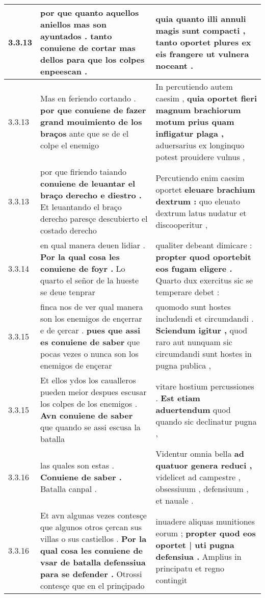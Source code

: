 \begin{tabular}{|p{1cm}|p{6.5cm}|p{6.5cm}|}
3.3.13 & por que quanto aquellos aniellos mas son ayuntados . \textbf{ tanto conuiene de cortar mas dellos } para que los colpes enpeescan . & quia quanto illi annuli magis sunt compacti , \textbf{ tanto oportet plures ex eis frangere } ut vulnera noceant . \\\hline
3.3.13 & Mas en feriendo cortando . \textbf{ por que conuiene de fazer grand mouimiento de los braços } ante que se de el colpe el enemigo & In percutiendo autem caesim , \textbf{ quia oportet fieri magnum brachiorum motum prius quam infligatur plaga , } aduersarius ex longinquo potest prouidere vulnus , \\\hline
3.3.13 & por que firiendo taiando \textbf{ conuiene de leuantar el braço derecho e diestro . } Et leuantando el braço derecho paresçe descubierto el costado derecho & Percutiendo enim caesim oportet \textbf{ eleuare brachium dextrum : } quo eleuato dextrum latus nudatur et discooperitur , \\\hline
3.3.14 & en qual manera deuen lidiar . \textbf{ Por la qual cosa les conuiene de foyr . } Lo quarto el señor de la hueste se deue tenprar & qualiter debeant dimicare : \textbf{ propter quod oportebit eos fugam eligere . } Quarto dux exercitus sic se temperare debet : \\\hline
3.3.15 & finca nos de ver qual manera son los enemigos de ençerrar e de çercar . \textbf{ pues que assi es conuiene de saber } que pocas vezes o nunca son los enemigos de ençerar & quomodo sunt hostes includendi et circumdandi . \textbf{ Sciendum igitur , } quod raro aut nunquam sic circumdandi sunt hostes in pugna publica , \\\hline
3.3.15 & Et ellos ydos los caualleros pueden meior despues escusar los colpes de los enemigos . \textbf{ Avn conuiene de saber } que quando se assi escusa la batalla & vitare hostium percussiones . \textbf{ Est etiam aduertendum } quod quando sic declinatur pugna , \\\hline
3.3.16 & las quales son estas . \textbf{ Conuiene de saber . } Batalla canpal . & Videntur omnia bella \textbf{ ad quatuor genera reduci , } videlicet ad campestre , obsessiuum , defensiuum , et nauale . \\\hline
3.3.16 & Et avn algunas vezes contesçe que algunos otros çercan sus villas o sus castiellos . \textbf{ Por la qual cosa les conuiene de vsar de batalla defenssiua para se defender . } Otrossi contesçe que en el prinçipado & inuadere aliquas munitiones eorum ; \textbf{ propter quod eos oportet | uti pugna defensiua . } Amplius in principatu et regno contingit \\\hline

\end{tabular}
